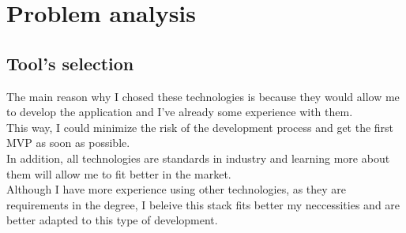 \chapter{Problem analysis}

\section{Tool's selection}

The main reason why I chosed these technologies is because they would allow me to develop the application and I've already some experience with them. \\ 

This way, I could minimize the risk of the development process and get the first MVP as soon as possible. \\

In addition, all technologies are standards in industry and learning more about them will allow me to fit better in the market. \\ 

Although I have more experience using other technologies, as they are requirements in the degree, I beleive this stack fits better my neccessities and are better adapted to this type of development.

